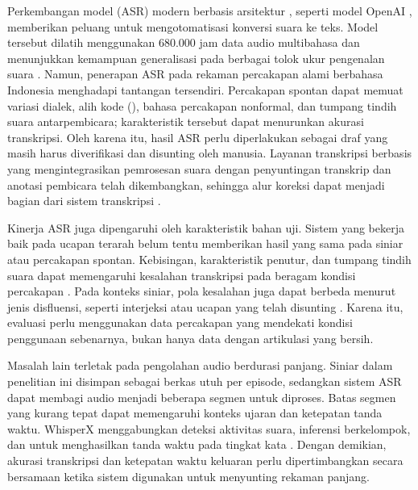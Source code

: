 Perkembangan model  (ASR) modern berbasis arsitektur , seperti model OpenAI , memberikan peluang untuk mengotomatisasi konversi suara ke teks. Model tersebut dilatih menggunakan 680.000 jam data audio multibahasa dan menunjukkan kemampuan generalisasi pada berbagai tolok ukur pengenalan suara . Namun, penerapan ASR pada rekaman percakapan alami berbahasa Indonesia menghadapi tantangan tersendiri. Percakapan spontan dapat memuat variasi dialek, alih kode (), bahasa percakapan nonformal, dan tumpang tindih suara antarpembicara; karakteristik tersebut dapat menurunkan akurasi transkripsi. Oleh karena itu, hasil ASR perlu diperlakukan sebagai draf yang masih harus diverifikasi dan disunting oleh manusia. Layanan transkripsi berbasis  yang mengintegrasikan pemrosesan suara dengan penyuntingan transkrip dan anotasi pembicara telah dikembangkan, sehingga alur koreksi dapat menjadi bagian dari sistem transkripsi .

Kinerja ASR juga dipengaruhi oleh karakteristik bahan uji. Sistem yang bekerja baik pada ucapan terarah belum tentu memberikan hasil yang sama pada siniar atau percakapan spontan. Kebisingan, karakteristik penutur, dan tumpang tindih suara dapat memengaruhi kesalahan transkripsi pada beragam kondisi percakapan . Pada konteks siniar, pola kesalahan juga dapat berbeda menurut jenis disfluensi, seperti interjeksi atau ucapan yang telah disunting . Karena itu, evaluasi perlu menggunakan data percakapan yang mendekati kondisi penggunaan sebenarnya, bukan hanya data dengan artikulasi yang bersih.

Masalah lain terletak pada pengolahan audio berdurasi panjang. Siniar dalam penelitian ini disimpan sebagai berkas utuh per episode, sedangkan sistem ASR dapat membagi audio menjadi beberapa segmen untuk diproses. Batas segmen yang kurang tepat dapat memengaruhi konteks ujaran dan ketepatan tanda waktu. WhisperX menggabungkan deteksi aktivitas suara, inferensi berkelompok, dan  untuk menghasilkan tanda waktu pada tingkat kata . Dengan demikian, akurasi transkripsi dan ketepatan waktu keluaran perlu dipertimbangkan secara bersamaan ketika sistem digunakan untuk menyunting rekaman panjang.


